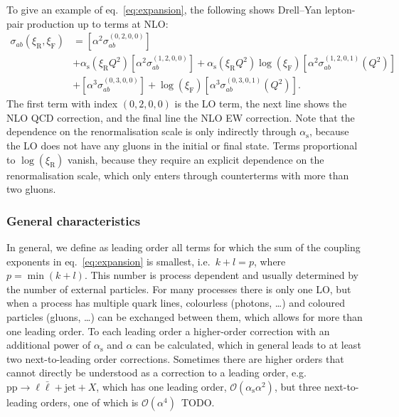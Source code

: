 To give an example of eq.~\eqref{eq:expansion}, the following shows Drell--Yan lepton-pair production up to terms at NLO:
\begin{equation}
\begin{split}
\sigma_{ab} (\xi_\mathrm{R}, \xi_\mathrm{F})
    &= \left[ \alpha^2 \sigma_{ab}^{(0,2,0,0)} \right] \\
    &+ \alpha_\mathrm{s} \left( \xi_\mathrm{R} Q^2 \right) \left[ \alpha^2 \sigma_{ab}^{(1,2,0,0)} \right] + \alpha_\mathrm{s} \left( \xi_\mathrm{R} Q^2 \right) \log (\xi_\mathrm{F}) \left[ \alpha^2 \sigma_{ab}^{(1,2,0,1)} (Q^2) \right] \\
    &+ \left[ \alpha^3 \sigma_{ab}^{(0,3,0,0)} \right] + \log (\xi_\mathrm{F}) \left[ \alpha^3 \sigma_{ab}^{(0,3,0,1)} (Q^2) \right] \text{.}
\end{split}
\end{equation}
The first term with index $(0,2,0,0)$ is the LO term, the next line shows the NLO QCD correction, and the final line the NLO EW correction.
Note that the dependence on the renormalisation scale is only indirectly through $\alpha_\mathrm{s}$, because the LO does not have any gluons in the initial or final state.
Terms proportional to $\log (\xi_\mathrm{R})$ vanish, because they require an explicit dependence on the renormalisation scale, which only enters through counterterms with more than two gluons.

\subsubsection{General characteristics}

In general, we define as leading order all terms for which the sum of the coupling exponents in eq.~\eqref{eq:expansion} is smallest, i.e.\ $k + l = p$, where $p = \min (k+l)$.
This number is process dependent and usually determined by the number of external particles.
For many processes there is only one LO, but when a process has multiple quark lines, colourless (photons, \dots) and coloured particles (gluons, \ldots) can be exchanged between them, which allows for more than one leading order.
To each leading order a higher-order correction with an additional power of $\alpha_\mathrm{s}$ and $\alpha$ can be calculated, which in general leads to at least two next-to-leading order corrections.
Sometimes there are higher orders that cannot directly be understood as a correction to a leading order, e.g.\ $\mathrm{p} \mathrm{p} \to \ell \bar{\ell} + \mathrm{jet} + X$, which has one leading order, $\mathcal{O} (\alpha_\mathrm{s} \alpha^2)$, but three next-to-leading orders, one of which is $\mathcal{O} (\alpha^4)$~TODO.

